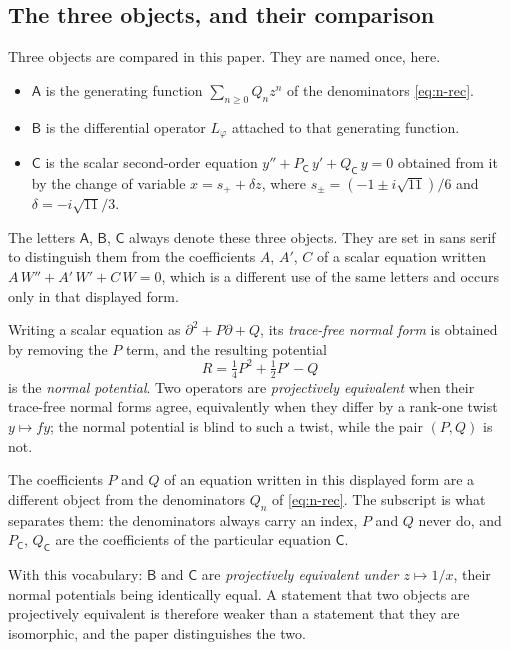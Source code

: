 \subsection{The three objects, and their comparison}\label{ssec:objects}

Three objects are compared in this paper. They are named once, here.

\begin{itemize}
\item \textbf{$\mathsf A$} is the generating function $\sum_{n\ge0}Q_nz^n$ of
  the denominators \eqref{eq:n-rec}.
\item \textbf{$\mathsf B$} is the differential operator $L_\varphi$ attached to
  that generating function.
\item \textbf{$\mathsf C$} is the scalar second-order equation
  $y''+P_{\mathsf C}\,y'+Q_{\mathsf C}\,y=0$ obtained from it by the change of
  variable $x=s_++\delta z$, where $s_\pm=(-1\pm i\sqrt{11})/6$ and
  $\delta=-i\sqrt{11}/3$.
\end{itemize}

The letters $\mathsf A$, $\mathsf B$, $\mathsf C$ always denote these three
objects. They are set in sans serif to distinguish them from the coefficients
$A$, $A'$, $C$ of a scalar equation written $A\,W''+A'\,W'+C\,W=0$, which is a
different use of the same letters and occurs only in that displayed form.

Writing a scalar equation as $\partial^2+P\partial+Q$, its \emph{trace-free
normal form} is obtained by removing the $P$ term, and the resulting potential
\[
  R=\tfrac14P^2+\tfrac12P'-Q
\]
is the \emph{normal potential}. Two operators are \emph{projectively
equivalent} when their trace-free normal forms agree, equivalently when they
differ by a rank-one twist $y\mapsto fy$; the normal potential is blind to such
a twist, while the pair $(P,Q)$ is not.

The coefficients $P$ and $Q$ of an equation written in this displayed form are
a different object from the denominators $Q_n$ of \eqref{eq:n-rec}. The
subscript is what separates them: the denominators always carry an index,
$P$ and $Q$ never do, and $P_{\mathsf C}$, $Q_{\mathsf C}$ are the
coefficients of the particular equation $\mathsf C$.

With this vocabulary: $\mathsf B$ and $\mathsf C$ are \emph{projectively
equivalent under $z\mapsto1/x$}, their normal potentials being identically
equal. A statement that two objects are projectively equivalent is therefore
weaker than a statement that they are isomorphic, and the paper distinguishes
the two.

